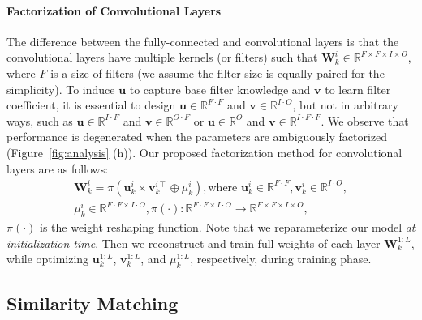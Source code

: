 \vspace{-0.05in}
\paragraph{Factorization of Convolutional Layers} The difference between the fully-connected and convolutional layers is that the convolutional layers have multiple kernels (or filters) such that $\textbf{W}_k^{i} \in \mathbb{R}^{F \times F \times I \times O}$, where $F$ is a size of filters (we assume the filter size is equally paired for the simplicity). To induce $\textbf{u}$ to capture base filter knowledge and $\textbf{v}$ to learn filter coefficient, it is essential to design $\textbf{u}\in \mathbb{R}^{F \cdot F}$ and $\textbf{v}\in \mathbb{R}^{I \cdot O}$, but not in arbitrary ways, such as $\textbf{u}\in \mathbb{R}^{I \cdot F}$ and $\textbf{v}\in \mathbb{R}^{O \cdot F}$ or $\textbf{u}\in \mathbb{R}^{O}$ and $\textbf{v}\in \mathbb{R}^{I \cdot F \cdot F}$. We observe that performance is degenerated when the parameters are ambiguously factorized  (Figure~\ref{fig:analysis} (h)). Our proposed factorization method for convolutional layers are as follows:
\vspace{-0.1in}
\begin{equation}
\begin{split}
\textbf{W}_k^{i} = \pi(\textbf{u}_k^{i} \times \textbf{v}_k^{i \intercal} \oplus {\mu}_k^{i}), \text{where }  \textbf{u}_k^{i} \in \mathbb{R}^{F \cdot F }, \textbf{v}_k^{i} \in \mathbb{R}^{I \cdot O }, \\
{\mu}_k^{i} \in \mathbb{R}^{F \cdot F \times I \cdot O}, \pi(\cdot): \mathbb{R}^{F \cdot F \times I \cdot O} \rightarrow \mathbb{R}^{F \times F \times I \times O},
\end{split}
\end{equation}
$\pi(\cdot)$ is the weight reshaping function. Note that we reparameterize our model \textit{at initialization time}. Then we reconstruct and train full weights of each layer $\textbf{W}_k^{1:L}$, while optimizing $\textbf{u}_k^{1:L}$, $\textbf{v}^{1:L}_k$, and ${\mu}^{1:L}_k$, respectively, during training phase. 






\subsection{Similarity Matching}
\label{subsec:sim}


